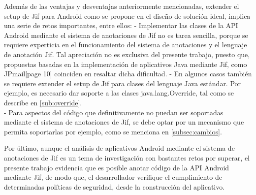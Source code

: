 Además de las ventajas y desventajas anteriormente mencionadas, extender el
setup de Jif para Android como se propone en el diseño de solución ideal,
implica una serie de retos importantes, entre ellos:\newline 
- Implementar las clases de la API Android mediante el sistema de anotaciones de
Jif no es tarea sencilla, porque se requiere experticia en el funcionamiento del
sistema de anotaciones y el lenguaje de anotación Jif. Tal apreciación no es
exclusiva del presente trabajo, puesto que, propuestas basadas en la
implementación de aplicativos Java mediante Jif, como
JPmail\cite{Hicks06fromlanguages}[page 10] coinciden en resaltar dicha
dificultad.\newline
- En algunos casos también se requiere extender el setup de Jif para clases del
lenguaje Java estándar. Por ejemplo, es necesario dar soporte a las clases
java.lang.Override, tal como se describe en \ref{sub:override}.\\
- Para aspectos del código que definitivamente no puedan ser soportadas
mediante el sistema de anotaciones de Jif, se debe optar por un mecanismo que
permita soportarlas por ejemplo, como se menciona en \ref{subsec:cambios}.
% 
% 
% 
% 
% 

Por último, aunque el análisis de aplicativos Android mediante el sistema de
anotaciones de Jif es un tema de investigación con bastantes retos por superar,
el presente trabajo evidencia que es posible anotar código de la API Android
mediante Jif, de modo que, el desarrollador verifique el cumplimiento de
determinadas políticas de seguridad, desde la construcción del aplicativo.


